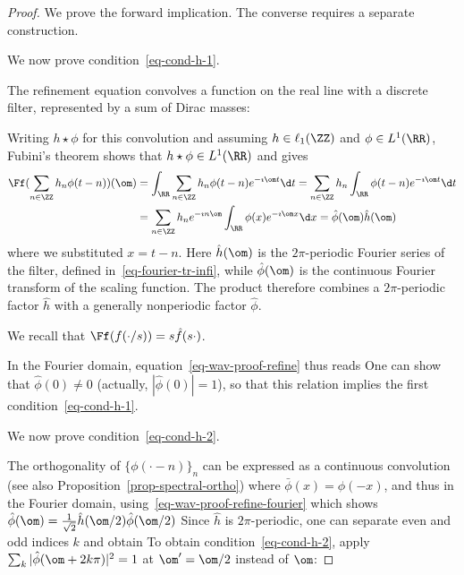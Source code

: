 \begin{proof} We prove the forward implication. The converse requires a separate construction.

  
We now prove condition~\eqref{eq-cond-h-1}.
 
The refinement equation convolves a function on the real line with a discrete filter, represented by a sum of Dirac masses:
 
Writing $h \star \phi$ for this convolution and assuming $h \in \ell_1(\ZZ)$ and $\phi \in L^1(\RR)$, Fubini's theorem shows that $h \star \phi \in L^1(\RR)$ and gives
\begin{align*}
	\Ff( \sum_{n \in \ZZ} h_n \phi(t-n) )(\om) &= \int_\RR \sum_{n \in \ZZ} h_n \phi(t-n) e^{-\imath \om t} \d t
	= \sum_{n \in \ZZ} h_n \int_\RR \phi(t-n) e^{-\imath \om t} \d t \\
	& = \sum_{n \in \ZZ} h_n e^{-\imath n \om } \int_\RR \phi(x) e^{-\imath \om x} \d x
	= \hat \phi(\om) \hat h(\om)
\end{align*}
where we substituted $x = t-n$. Here $\hat h(\om)$ is the $2\pi$-periodic Fourier series of the filter, defined in~\eqref{eq-fourier-tr-infi}, while $\hat\phi(\om)$ is the continuous Fourier transform of the scaling function. The product therefore combines a $2\pi$-periodic factor $\hat h$ with a generally nonperiodic factor $\hat \phi$.
 
We recall that $\Ff(f(\cdot/s)) = s \hat f(s \cdot)$.
 
In the Fourier domain, equation~\eqref{eq-wav-proof-refine} thus reads
One can show that $\hat \phi(0) \neq 0$ (actually, $|\hat \phi(0)| = 1$), so that this relation implies the first condition~\eqref{eq-cond-h-1}.


  
We now prove condition~\eqref{eq-cond-h-2}.
 
The orthogonality of $\{\phi(\cdot-n)\}_n$ can be expressed as a continuous convolution (see also Proposition~\ref{prop-spectral-ortho})
where $\bar \phi(x) = \phi(-x)$, 
and thus in the Fourier domain, using~\eqref{eq-wav-proof-refine-fourier} which shows $\hat\phi(\om) = \frac{1}{\sqrt{2}}\hat h(\om/2) \hat \phi(\om/2)$
Since $\hat h$ is $2\pi$-periodic, one can separate even and odd indices $k$ and obtain
To obtain condition~\eqref{eq-cond-h-2}, apply $\sum_k |\hat \phi(\om+2k\pi)|^2=1$ at $\om'=\om/2$ instead of $\om$:


\end{proof}

